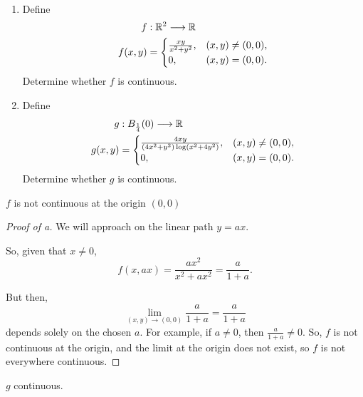 \documentclass[../quiz3]{subfiles}
\begin{document}
\begin{problem}[2]\
\begin{enumerate}[label=(\alph*)]
	\item Define \begin{align*}
		      f      & : \mathbb{R}^{2}  \longrightarrow \mathbb{R}             \\
		      f(x,y) & =  \begin{cases}
			                  \frac{xy}{x^2+y^2}, & (x,y)\neq(0,0), \\
			                  0,                  & (x,y)=(0,0).
		                  \end{cases}
	      \end{align*}
	      Determine whether $f$ is continuous.
	\item Define \begin{align*}
		      g      & : B_{\frac{1}{4}}(0) \longrightarrow \mathbb{R}                   \\
		      g(x,y) & = \begin{cases}
			                 \frac{4xy}{(4x^2+y^2)\log(x^2+4y^2)}, & (x,y)\neq(0,0), \\
			                 0,                                    & (x,y)=(0,0).
		                 \end{cases}
	      \end{align*}
	      Determine whether $g$ is continuous.
\end{enumerate}
\end{problem}
\begin{proposition}[a]
	$f$ is not continuous at the origin  $(0,0)$
\end{proposition}
\begin{proof}[Proof of a]
	We will approach on the linear path $y=ax$.

	So, given that $x \neq 0$,  \[
		f(x,ax)=\frac{ax^2}{x^2+ax^2}=\frac{a}{1+a}
		.\]

	But then, \[
		\lim_{(x,y) \to (0,0)} \frac{a}{1+a}=\frac{a}{1+a}
	\] depends solely on the chosen $a$. For example, if  $a\neq 0$, then $\frac{a}{1+a}\neq 0$. So, $f$ is not continuous at the origin, and the limit at the origin does not exist, so $f$ is not everywhere continuous.
\end{proof}
\begin{proposition}[b]
	$g$ continuous.
\end{proposition}
\end{document}
